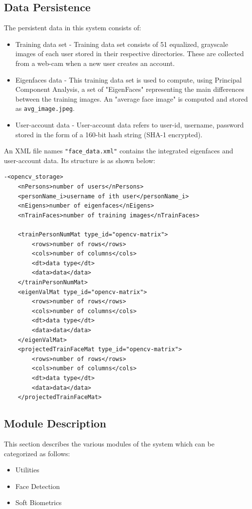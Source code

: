\documentclass[12pt]{article}			%
\begin{document}
\subsection{ Data Persistence }
The persistent data in this system consists of:
\begin{itemize}
\item Training data set - Training data set consists of 51 equalized, grayscale images of each user stored in their respective directories. These are collected from a web-cam when a new user creates an account.%
\item Eigenfaces data - This training data set is used to compute, using Principal Component Analysis, a set of "EigenFaces" representing the main differences between the training images. An "average face image" is computed and stored as \verb+avg_image.jpeg+. 
\item User-account data - User-account data refers to user-id, username, password stored in the form of a 160-bit hash string (SHA-1 encrypted).
\end{itemize}

An XML file names \verb+"face_data.xml"+ contains the integrated eigenfaces and user-account data. Its structure is as shown below:
\begin{verbatim}
-<opencv_storage>
	<nPersons>number of users</nPersons>
	<personName_i>username of ith user</personName_i>
	<nEigens>number of eigenfaces</nEigens>
	<nTrainFaces>number of training images</nTrainFaces>
	
	<trainPersonNumMat type_id="opencv-matrix">
		<rows>number of rows</rows>
		<cols>number of columns</cols>
		<dt>data type</dt>
		<data>data</data>
	</trainPersonNumMat>
	<eigenValMat type_id="opencv-matrix">
		<rows>number of rows</rows>
		<cols>number of columns</cols>
		<dt>data type</dt>
		<data>data</data>
	</eigenValMat>
	<projectedTrainFaceMat type_id="opencv-matrix">
		<rows>number of rows</rows>
		<cols>number of columns</cols>
		<dt>data type</dt>
		<data>data</data>
	</projectedTrainFaceMat>
\end{verbatim}

\subsection{ Module Description }
This section describes the various modules of the system which can be categorized as follows:
\begin{itemize}
\item Utilities
\item Face Detection
\item Soft Biometrics
\end{itemize}
\end{document}
